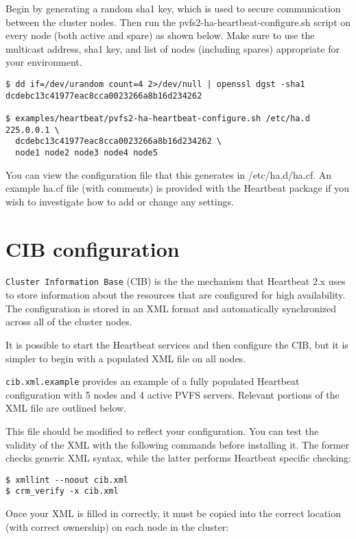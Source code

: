 \documentclass[11pt]{article}
\begin{document}
Begin by generating a random sha1 key, which is used to
secure communication between the cluster nodes.  Then run the
pvfs2-ha-heartbeat-configure.sh script on every node (both active
and spare) as shown below.  Make sure to use the multicast address, sha1
key, and list of nodes (including spares) appropriate for your environment.

\begin{verbatim}
$ dd if=/dev/urandom count=4 2>/dev/null | openssl dgst -sha1
dcdebc13c41977eac8cca0023266a8b16d234262

$ examples/heartbeat/pvfs2-ha-heartbeat-configure.sh /etc/ha.d 225.0.0.1 \
  dcdebc13c41977eac8cca0023266a8b16d234262 \
  node1 node2 node3 node4 node5
\end{verbatim}

You can view the configuration file that this generates in
/etc/ha.d/ha.cf.  An example ha.cf file (with comments) is provided with
the Heartbeat package if you wish to investigate how to add or change any settings.

\section{CIB configuration}

\texttt{Cluster Information Base} (CIB) is the the mechanism that
Heartbeat 2.x uses to store information about the resources that are 
configured for high availability.  The configuration is stored in an
XML format and automatically synchronized across all of the cluster
nodes.

It is possible to start the Heartbeat services and then configure the
CIB, but it is simpler to begin with a populated XML file on all nodes.

\texttt{cib.xml.example} provides an example of a fully populated
Heartbeat configuration with 5 nodes and 4 active PVFS servers.  Relevant
portions of the XML file are outlined below.

This file should be modified to reflect your configuration.  You can
test the validity of the XML with the following commands before
installing it.  The former checks generic XML syntax, while the latter
performs Heartbeat specific checking:

\begin{verbatim}
$ xmllint --noout cib.xml
$ crm_verify -x cib.xml
\end{verbatim}

Once your XML is filled in correctly, it must be copied into the correct
location (with correct ownership) on each node in the cluster:
\end{document}
